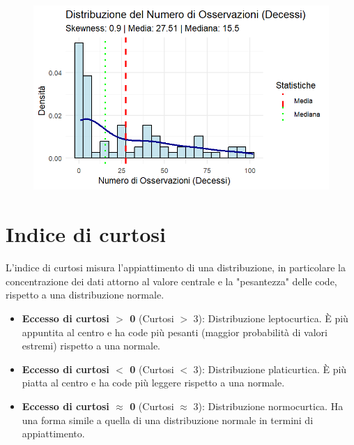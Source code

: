 \documentclass[14pt, openany, titlepage]{report} %
\begin{document}
\begin{figure}[H] 
    \centering
    \includegraphics[width=12cm, height=7cm]{Rplot06.png} 
\end{figure}

\section{Indice di curtosi} 
L'indice di curtosi misura l'appiattimento di
 una distribuzione, in particolare la concentrazione dei dati attorno
  al valore centrale e la "pesantezza" delle code, rispetto a una 
  distribuzione normale.
\begin{itemize}
    \item \textbf{Eccesso di curtosi $>$ 0} (Curtosi $>$ 3): Distribuzione leptocurtica. È più appuntita al centro e ha code più pesanti (maggior probabilità di valori estremi) rispetto a una normale.
    \item \textbf{Eccesso di curtosi $<$ 0} (Curtosi $<$ 3): Distribuzione platicurtica. È più piatta al centro e ha code più leggere rispetto a una normale.
    \item \textbf{Eccesso di curtosi $\approx$ 0} (Curtosi $\approx$ 3): Distribuzione normocurtica. Ha una forma simile a quella di una distribuzione normale in termini di appiattimento.
\end{itemize}
\end{document}
